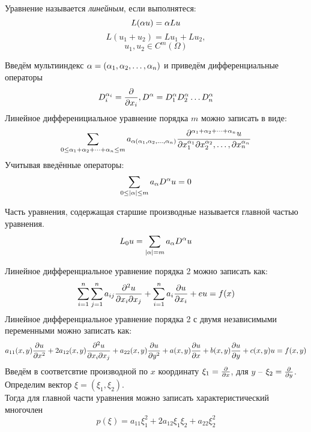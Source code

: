 \documentclass[../main.tex]{subfiles}
\begin{document}
Уравнение называется \textit{линейным}, если выполнятеся:
    \[L(\alpha u)=\alpha Lu\]
    \[L(u_1+u_2)=Lu_1 + Lu_2,\]
    \[u_1, u_2 \in C^m(\Omega)\]

Введём мультииндекс $\alpha = (\alpha_1,\alpha_2,\dots,\alpha_n)$ и приведём дифференциальные операторы
\[D^{\alpha_i}_i=\frac{\partial  }{\partial x_i}, D^\alpha = D^\alpha_1 D^\alpha_2\dots D^\alpha_n\]
Линейное дифференициальное уравнение порядка $m$ можно записать в виде:
\[
    \sum_{0 \leq \alpha_1+\alpha_2+\dots+\alpha_n \leq m}
    a_{\alpha(\alpha_1, \alpha_2, \dots, \alpha_n)}
    \frac{\partial ^{\alpha_1+\alpha_2+\dots+\alpha_n}u}{\partial x_1^{\alpha_1} \partial{x_2^{\alpha_2}}, \dots, \partial{x_n^{\alpha_n}}}
\]
Учитывая введённые операторы:
\[
    \sum_{0 \leq |\alpha| \leq m}a_\alpha D^\alpha u = 0
\]

\begin{definition}
    Часть уравнения, содержащая старшие производные называется
    главной частью уравнения.
    \[L_0u = \sum_{|\alpha|=m} a_\alpha D^\alpha u\]
\end{definition}
Линейное дифференциальное уравнение порядка 2 можно записать как:
\[
    \sum^n_{i=1}\sum^n_{j=1}a_{ij}\frac{\partial ^2u}{\partial x_i \partial{x_j}} + 
    \sum^n_{i=1}a_i\frac{\partial u}{\partial x_i} + eu = f(x)
\]
Линейное дифференциальное уравнение порядка 2 с двумя 
независимыми переменными можно записать как:
\begin{equation}
    \label{eq:1.1} %
    a_{11}(x,y)\pderiv{u}{x^2} + 2a_{12}(x,y)\pderiv{^2u}{x_i \partial{x_j}} +
    a_{22}(x,y)\pderiv{u}{y^2} + a(x,y)\pderiv{u}{x} + b(x,y)\pderiv{u}{y} + c(x,y)u = f(x,y)
\end{equation}
Введём в соответсвтие производной по $x$ координату $\xi_1=\frac{\partial  }{\partial x}$,
для $y$ -- $\xi_2 = \frac{\partial  }{\partial y}$. Определим вектор $\xi=(\xi_1, \xi_2)$.\\
Тогда для главной части уравнения можно записать характеристический многочлен
\[
    p(\xi)=a_{11}\xi_1^2 + 2a_{12}\xi_1\xi_2 + a_{22}\xi_2^2
\]
\end{document}
